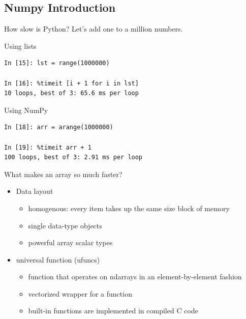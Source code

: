 \subsection*{Numpy Introduction}

\begin{frame}[fragile]
How slow is Python?  Let's add one to a million numbers.

\begin{block}{Using lists}
\begin{verbatim}
In [15]: lst = range(1000000)

In [16]: %timeit [i + 1 for i in lst]
10 loops, best of 3: 65.6 ms per loop
\end{verbatim}
\end{block}

\begin{block}{Using NumPy}
\begin{verbatim}
In [18]: arr = arange(1000000)

In [19]: %timeit arr + 1
100 loops, best of 3: 2.91 ms per loop
\end{verbatim}
\end{block}
\end{frame}

\begin{frame}
  What makes an array so much faster?
  \begin{itemize}
  \item Data layout
    \begin{itemize}
    \item homogenous: every item takes up the same size block of memory
    \item single data-type objects
    \item powerful array scalar types
    \end{itemize}
  \item universal function (ufuncs)
    \begin{itemize}
    \item function that operates on ndarrays in an element-by-element fashion
    \item vectorized wrapper for a function
    \item built-in functions are implemented in compiled C code
    \end{itemize}
\end{itemize}
\end{frame}

